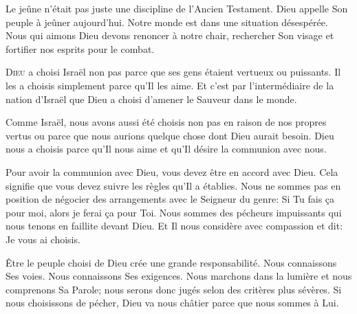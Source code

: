 Le jeûne n'était pas juste une discipline de l'Ancien Testament.
 Dieu appelle Son peuple à jeûner aujourd'hui.
 Notre monde est dans une situation désespérée.
 Nous qui aimons Dieu devons renoncer à notre chair,
 rechercher Son visage et fortifier nos esprits pour le combat. 

\dvrule







\lettrine{D}{ieu} a choisi Israël \ocadr non pas parce que ses gens
 étaient vertueux ou puissants. Il les a choisis simplement parce
 qu'Il les aime. Et c'est par l'intermédiaire de la nation d'Israël
 que Dieu a choisi d'amener le Sauveur dans le monde. 

Comme Israël, nous avons aussi été choisis non pas en raison de nos propres
 vertus ou parce que nous aurions quelque chose dont Dieu aurait besoin.
 Dieu nous a choisis parce qu'Il nous aime et qu'Il désire
 la communion avec nous. 


Pour avoir la communion avec Dieu, vous devez être en accord avec Dieu.
 Cela signifie que vous devez suivre les règles qu'Il a établies.
 Nous ne sommes pas en position de négocier des arrangements
 avec le Seigneur du genre:
 \Og Si Tu fais \c{c}a pour moi, alors je ferai \c{c}a pour Toi. \Fg{}
 Nous sommes des pécheurs impuissants qui nous tenons en faillite devant Dieu.
 Et Il nous considère avec compassion et dit: 
 \Og Je vous ai choisis. \Fg{}

Être le peuple choisi de Dieu crée une grande responsabilité.
 Nous connaissons Ses voies. Nous connaissons Ses exigences.
 Nous marchons dans la lumière et nous comprenons Sa Parole;
 nous serons donc jugés selon des critères plus sévères.
 Si nous choisissons de pécher, Dieu va nous châtier
 parce que nous sommes à Lui. 

